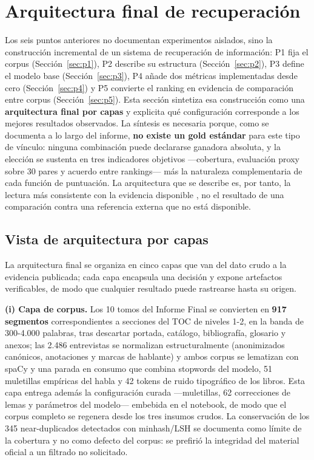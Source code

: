 \documentclass[11pt]{tg_usta}
\begin{document}
\section{Arquitectura final de recuperación}\label{sec:arquitectura}

Los seis puntos anteriores no documentan experimentos aislados, sino la construcción incremental de un sistema de recuperación de información: P1 fija el corpus (Sección~\ref{sec:p1}), P2 describe su estructura (Sección~\ref{sec:p2}), P3 define el modelo base (Sección~\ref{sec:p3}), P4 añade dos métricas implementadas desde cero (Sección~\ref{sec:p4}) y P5 convierte el ranking en evidencia de comparación entre corpus (Sección~\ref{sec:p5}). Esta sección sintetiza esa construcción como una \textbf{arquitectura final por capas} y explicita qué configuración corresponde a los mejores resultados observados. La síntesis es necesaria porque, como se documenta a lo largo del informe, \textbf{no existe un gold estándar} para este tipo de vínculo: ninguna combinación puede declararse ganadora absoluta, y la elección se sustenta en tres indicadores objetivos ---cobertura, evaluación proxy sobre 30 pares y acuerdo entre rankings--- más la naturaleza complementaria de cada función de puntuación. La arquitectura que se describe es, por tanto, la lectura más consistente con la evidencia disponible \cite{sosa2025constructing,valentini2024messirve}, no el resultado de una comparación contra una referencia externa que no está disponible.

\subsection{Vista de arquitectura por capas}

La arquitectura final se organiza en cinco capas que van del dato crudo a la evidencia publicada; cada capa encapsula una decisión y expone artefactos verificables, de modo que cualquier resultado puede rastrearse hasta su origen.

\textbf{(i) Capa de corpus.} Los 10 tomos del Informe Final \cite{cev2022informe} se convierten en \textbf{917 segmentos} correspondientes a secciones del TOC de niveles 1-2, en la banda de 300-4.000 palabras, tras descartar portada, catálogo, bibliografía, glosario y anexos; las 2.486 entrevistas se normalizan estructuralmente (anonimizados canónicos, anotaciones y marcas de hablante) y ambos corpus se lematizan con spaCy \cite{spacy2024model} y una parada en consumo que combina stopwords del modelo, 51 muletillas empíricas del habla \cite{moreno2024detection} y 42 tokens de ruido tipográfico de los libros. Esta capa entrega además la configuración curada ---muletillas, 62 correcciones de lemas y parámetros del modelo--- embebida en el notebook, de modo que el corpus completo se regenera desde los tres insumos crudos. La conservación de los 345 near-duplicados detectados con minhash/LSH \cite{broder1997resemblance} se documenta como límite de la cobertura y no como defecto del corpus: se prefirió la integridad del material oficial a un filtrado no solicitado.
\end{document}
